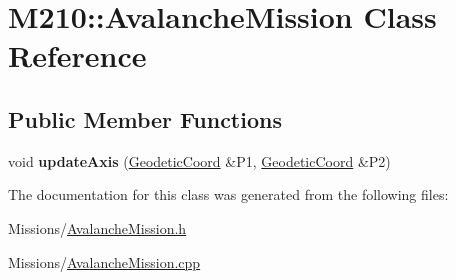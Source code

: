\hypertarget{class_m210_1_1_avalanche_mission}{}\section{M210\+:\+:Avalanche\+Mission Class Reference}
\label{class_m210_1_1_avalanche_mission}
\subsection*{Public Member Functions}
\begin{DoxyCompactItemize}
\item 
\mbox{\label{class_m210_1_1_avalanche_mission_a11f7b825c70ca76e713e1397803dfea2}} 
void {\bfseries update\+Axis} (\mbox{\hyperlink{class_m210_1_1_geodetic_coord}{Geodetic\+Coord}} \&P1, \mbox{\hyperlink{class_m210_1_1_geodetic_coord}{Geodetic\+Coord}} \&P2)
\end{DoxyCompactItemize}


The documentation for this class was generated from the following files\+:\begin{DoxyCompactItemize}
\item 
Missions/\mbox{\hyperlink{_avalanche_mission_8h}{Avalanche\+Mission.\+h}}\item 
Missions/\mbox{\hyperlink{_avalanche_mission_8cpp}{Avalanche\+Mission.\+cpp}}\end{DoxyCompactItemize}
